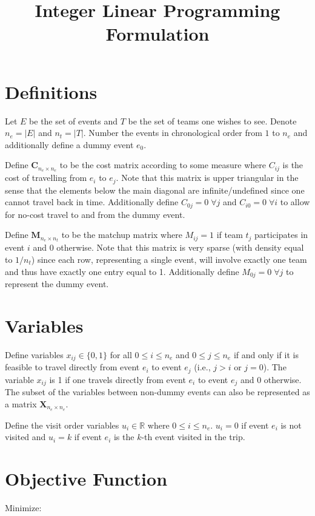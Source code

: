 \documentclass[11pt]{article}
\title{Integer Linear Programming Formulation}
\date{}
\begin{document}
\maketitle

\section{Definitions}
Let $E$ be the set of events and $T$ be the set of teams one wishes to see. Denote $n_e = |E|$ and $n_t = |T|$. Number the events in chronological order from $1$ to $n_e$ and additionally define a dummy event $e_0$.

Define $\mathbf{C}_{n_e \times n_e}$ to be the cost matrix according to some measure where $C_{ij}$ is the cost of travelling from $e_i$ to $e_j$. Note that this matrix is upper triangular in the sense that the elements below the main diagonal are infinite/undefined since one cannot travel back in time. Additionally define $C_{0j} = 0 \; \forall j$ and $C_{i0} = 0 \; \forall i$ to allow for no-cost travel to and from the dummy event.

Define $\mathbf{M}_{n_e \times n_t}$ to be the matchup matrix where $M_{ij} = 1$ if team $t_j$ participates in event $i$ and 0 otherwise. Note that this matrix is very sparse (with density equal to $1/n_t$) since each row, representing a single event, will involve exactly one team and thus have exactly one entry equal to 1. Additionally define $M_{0j} = 0 \; \forall j$ to represent the dummy event.

\section{Variables}
Define variables $x_{ij} \in \{0, 1\}$ for all $0 \leq i \leq n_e$ and $0 \leq j \leq n_e$ if and only if it is feasible to travel directly from event $e_i$ to event $e_j$ (i.e., $j > i$ or $j = 0$). The variable $x_{ij}$ is 1 if one travels directly from event $e_i$ to event $e_j$ and 0 otherwise. The subset of the variables between non-dummy events can also be represented as a matrix $\mathbf{X}_{n_e \times n_e}$.

Define the visit order variables $u_i \in \mathbb{R}$ where $0 \leq i \leq n_e$. $u_i = 0$ if event $e_i$ is not visited and $u_i = k$ if event $e_i$ is the $k$-th event visited in the trip.

\section{Objective Function}
Minimize:
\end{document}
